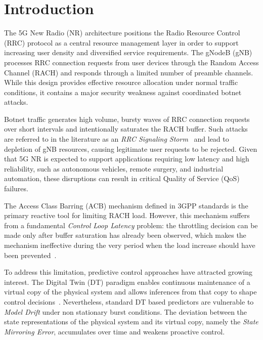 \documentclass[conference]{IEEEtran}
\begin{document}
\section{Introduction}

The 5G New Radio (NR) architecture positions the Radio Resource Control (RRC) protocol as a central resource management layer in order to support increasing user density and diversified service requirements. The gNodeB (gNB) processes RRC connection requests from user devices through the Random Access Channel (RACH) and responds through a limited number of preamble channels. While this design provides effective resource allocation under normal traffic conditions, it contains a major security weakness against coordinated botnet attacks.

Botnet traffic generates high volume, bursty waves of RRC connection requests over short intervals and intentionally saturates the RACH buffer. Such attacks are referred to in the literature as an \emph{RRC Signaling Storm}~\cite{b1} and lead to depletion of gNB resources, causing legitimate user requests to be rejected. Given that 5G NR is expected to support applications requiring low latency and high reliability, such as autonomous vehicles, remote surgery, and industrial automation, these disruptions can result in critical Quality of Service (QoS) failures.

The Access Class Barring (ACB) mechanism defined in 3GPP standards is the primary reactive tool for limiting RACH load. However, this mechanism suffers from a fundamental \emph{Control Loop Latency} problem: the throttling decision can be made only after buffer saturation has already been observed, which makes the mechanism ineffective during the very period when the load increase should have been prevented~\cite{b2}.

To address this limitation, predictive control approaches have attracted growing interest. The Digital Twin (DT) paradigm enables continuous maintenance of a virtual copy of the physical system and allows inferences from that copy to shape control decisions~\cite{b3}. Nevertheless, standard DT based predictors are vulnerable to \emph{Model Drift} under non stationary burst conditions. The deviation between the state representations of the physical system and its virtual copy, namely the \emph{State Mirroring Error}, accumulates over time and weakens proactive control.
\end{document}
